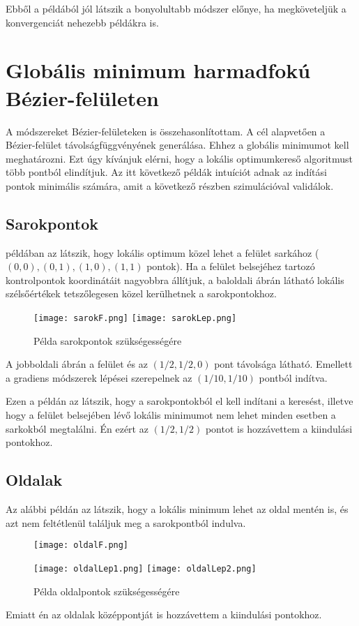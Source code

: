 Ebből a példából jól látszik a bonyolultabb módszer előnye, ha megköveteljük a konvergenciát nehezebb példákra is.



\section{Globális minimum harmadfokú Bézier-felületen}

A módszereket Bézier-felületeken is összehasonlítottam. A cél alapvetően a Bézier-felület távolságfüggvényének generálása. Ehhez a globális minimumot kell meghatározni. Ezt úgy kívánjuk elérni, hogy a lokális optimumkereső algoritmust több pontból elindítjuk. Az itt következő példák intuíciót adnak az indítási pontok minimális számára, amit a következő részben szimulációval validálok.

\subsection{Sarokpontok}
 példában az látszik, hogy lokális optimum közel lehet a felület sarkához ($(0,0),(0,1),(1,0),(1,1)$ pontok). Ha a felület belsejéhez tartozó kontrolpontok koordinátáit nagyobbra állítjuk, a baloldali ábrán látható lokális szélsőértékek tetszőlegesen közel kerülhetnek a sarokpontokhoz. 
\begin{figure}[H]
	\centering
	\texttt{[image: sarokF.png]}
	\hspace{5pt}
	\texttt{[image: sarokLep.png]}
	\caption{Példa sarokpontok szükségességére}
	\label{fig:corners}
\end{figure}
A jobboldali ábrán a felület és az $(1/2,1/2,0)$ pont távolsága látható. Emellett a gradiens módszerek lépései szerepelnek az $(1/10,1/10)$ pontból indítva.

Ezen a példán az látszik, hogy a sarokpontokból el kell indítani a keresést, illetve hogy a felület belsejében lévő lokális minimumot nem lehet minden esetben a sarkokból megtalálni. Én ezért az $(1/2,1/2)$ pontot is hozzávettem a kiindulási pontokhoz.

\subsection{Oldalak}
Az alábbi példán az látszik, hogy a lokális minimum lehet az oldal mentén is, és azt nem feltétlenül találjuk meg a sarokpontból indulva.
\begin{figure}[H]
	\centering
	\texttt{[image: oldalF.png]}
\end{figure}
\begin{figure}[H]
	\centering
	\texttt{[image: oldalLep1.png]}
	\hspace{5pt}
	\texttt{[image: oldalLep2.png]}
	\caption{Példa oldalpontok szükségességére}
\end{figure}
Emiatt én az oldalak középpontját is hozzávettem a kiindulási pontokhoz.

